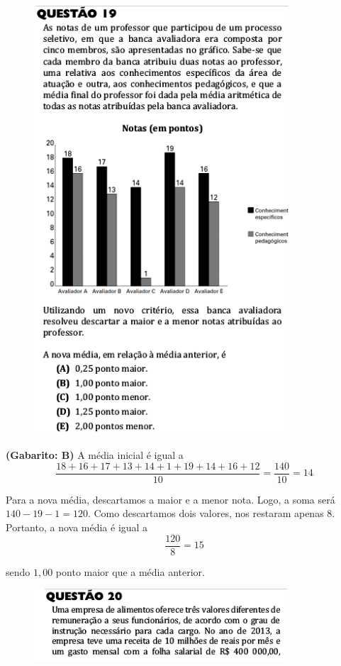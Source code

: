 \documentclass[a4paper]{article}
\begin{document}
\begin{figure}[H]
	\begin{center}
		\includegraphics[width=9.5cm]{L1Q19.png}
	\end{center}
\end{figure}
\par\textbf{(Gabarito: B)} A média inicial é igual a 
\begin{equation*}
\frac{18+16+17+13+14+1+19+14+16+12}{10} = \frac{140}{10} = 14
\end{equation*}
\par\vspace{0.3cm} Para a nova média, descartamos a maior e a menor nota. Logo, a soma será $140-19-1 = 120$. Como descartamos dois valores, nos restaram apenas $8$. Portanto, a nova média é igual a
\begin{equation*}
\frac{120}{8} = 15
\end{equation*}
\par\vspace{0.3cm} sendo $1,00$ ponto maior que a média anterior.
\begin{figure}[H]
	\begin{center}
		\includegraphics[width=9.5cm]{L1Q20_1.png}
	\end{center}
\end{figure}
\end{document}
